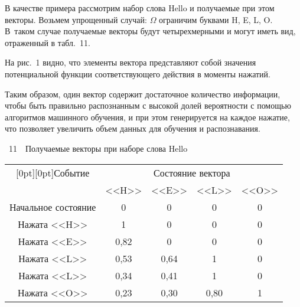\begin{multicols}{2}
В качестве примера рассмотрим набор слова {\sf Hello} и
получаемые при этом векторы. Возьмем упрощенный случай: $\Omega$
ограничим буквами {\sf H, E, L, O}. В~таком случае получаемые
векторы будут четырехмерными и могут иметь вид, отраженный в
табл.~11.

На рис.~1 видно, что элементы вектора
представляют собой значения потенциальной функции соответствующего
действия в моменты нажатий.

Таким образом, один вектор содержит достаточное количество
информации, чтобы быть правильно распознанным с высокой долей
ве\-ро\-ят\-ности с помощью алгоритмов машинного обучения, и при этом
генерируется на каждое нажатие, что позволяет увеличить объем данных
для обучения и распознавания.


 \vspace*{14pt} %
 
\noindent
{{\tablename~11}\ \ \small{Получаемые векторы при наборе слова {\sf Hello}}}



\begin{center} 
{\small
\tabcolsep=7.5pt
\begin{tabular}{|c|c|c|c|c|}
\hline
\multicolumn{1}{|c|}{\raisebox{-6pt}[0pt][0pt]{Событие}} & \multicolumn{4}{c|}{Состояние вектора} \\
\cline{2-5}
& <<{\sf H}>> & <<{\sf E}>> & {<<{\sf L}>>} & {<<{\sf O}>>} \\
\hline
Начальное состояние & 0\hphantom{,99} & 0\hphantom{,99} & 0\hphantom{,99} & 0 \\
Нажата <<{\sf H}>> & 1\hphantom{,99} & 0\hphantom{,99} & 0\hphantom{,99} & 0 \\
Нажата <<{\sf E}>> & 0,82 & 0\hphantom{,99} & 0\hphantom{,99} & 0 \\
Нажата {<<{\sf L}>>} & 0,53 & 0,64 & 1\hphantom{,99} & 0 \\
Нажата {<<{\sf L}>>} & 0,34 & 0,41 & 1\hphantom{,99} & 0 \\
Нажата <<{\sf O}>> & 0,23 & 0,30 & 0,80 & 1 \\
\hline
\end{tabular}}
\end{center}

\setcounter{figure}{1}
\begin{figure*}[b] %
\vspace*{9pt}
 \begin{center}
 \mbox{%
 \epsfxsize=163.641mm
 }
 \end{center}
 \vspace*{-6pt}
    \label{roc_si6}
\end{figure*}


\end{multicols}
